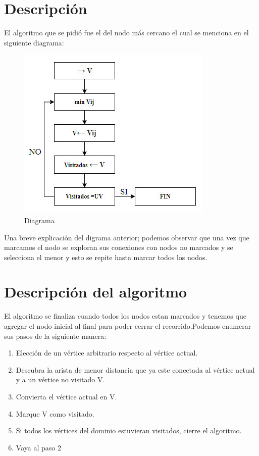 \documentclass[12pt,a4paper]{article}
\begin{document}
\section{Descripción}
 El algoritmo que se pidió fue el del nodo más cercano el cual se menciona en el siguiente diagrama:
 \begin{figure}[ht]
    \centering
    \includegraphics[scale = 0.5]{diagrama.jpeg}
    \caption{Diagrama}     
 \end{figure}
 \newpage Una breve explicación del digrama anterior; podemos observar que una vez que marcamos el nodo se exploran sus conexiones con nodos no marcados y se selecciona el menor y esto se repite hasta marcar todos los nodos.
\section{Descripción del algoritmo}
 El algoritmo se finaliza cuando todos los nodos estan marcados y tenemos que agregar el nodo inicial al final para poder cerrar el recorrido.Podemos enumerar sus pasos de la siguiente manera:
\begin{enumerate}
    \item Elección de un vértice arbitrario respecto al vértice actual.
    \item Descubra la arista de menor distancia que ya este conectada al vértice actual y a un vértice no visitado V.
    \item Convierta el vértice actual en V.
    \item Marque V como visitado.
    \item Si todos los vértices del dominio estuvieran visitados, cierre el algoritmo.
    \item Vaya al paso 2
\end{enumerate}
\end{document}

